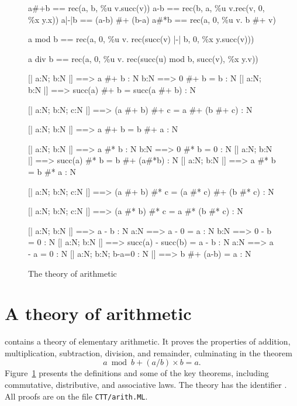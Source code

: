 \begin{figure} 
\begin{ttbox}
           a#+b  == rec(a, b, \%u v.succ(v))  
          a-b   == rec(b, a, \%u v.rec(v, 0, \%x y.x))  
       a|-|b == (a-b) #+ (b-a)  
          a#*b  == rec(a, 0, \%u v. b #+ v)  

   a mod b == rec(a, 0,
                      \%u v. rec(succ(v) |-| b, 0, \%x y.succ(v)))  

   a div b == rec(a, 0,
                      \%u v. rec(succ(u) mod b, succ(v), \%x y.v))
\end{ttbox}

\begin{ttbox}
        [| a:N;  b:N |] ==> a #+ b : N
             b:N ==> 0 #+ b = b : N
         [| a:N;  b:N |] ==> succ(a) #+ b = succ(a #+ b) : N

         [| a:N;  b:N;  c:N |] ==> 
                  (a #+ b) #+ c = a #+ (b #+ c) : N

       [| a:N;  b:N |] ==> a #+ b = b #+ a : N

       [| a:N;  b:N |] ==> a #* b : N
            b:N ==> 0 #* b = 0 : N
        [| a:N;  b:N |] ==> succ(a) #* b = b #+ (a#*b) : N
      [| a:N;  b:N |] ==> a #* b = b #* a : N

     [| a:N;  b:N;  c:N |] ==> 
                  (a #+ b) #* c = (a #* c) #+ (b #* c) : N

        [| a:N;  b:N;  c:N |] ==> 
                  (a #* b) #* c = a #* (b #* c) : N

       [| a:N;  b:N |] ==> a - b : N
            a:N ==> a - 0 = a : N
       b:N ==> 0 - b = 0 : N
    [| a:N;  b:N |] ==> succ(a) - succ(b) = a - b : N
    a:N ==> a - a = 0 : N
  [| a:N;  b:N;  b-a=0 : N |] ==> b #+ (a-b) = a : N
\end{ttbox}
\caption{The theory of arithmetic} \label{ctt-arith}
\end{figure}


\section{A theory of arithmetic}
{\CTT} contains a theory of elementary arithmetic.  It proves the
properties of addition, multiplication, subtraction, division, and
remainder, culminating in the theorem
\[ a \bmod b + (a/b)\times b = a. \]
Figure~\ref{ctt-arith} presents the definitions and some of the key
theorems, including commutative, distributive, and associative laws.  The
theory has the {\ML} identifier .  All proofs are on
the file {\tt CTT/arith.ML}.

